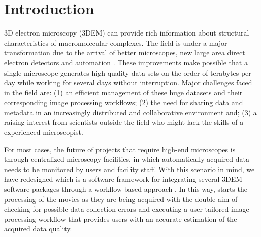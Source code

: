
\section{Introduction}

3D electron microscopy (3DEM)  can provide rich information about structural characteristics of macromolecular complexes. The field is under a major transformation due to the arrival of better microscopes, new large area direct electron detectors and automation \citep{kuhlbrandt2014a, Kuhlbrandt2014b}. These improvements make possible that a single microscope generates high quality data sets on the order of terabytes per day \citep{Saibil2015} while working for several days without interruption. Major challenges faced in the field are: (1) an efficient management of these huge datasets and their corresponding image processing workflows; (2) the need for sharing data and metadata  in an increasingly distributed and collaborative environment and; (3) a raising interest from scientists outside the field who might lack the skills of a experienced microscopist. %



For most cases, the future of projects that require high-end microscopes is through centralized microscopy facilities, in which automatically acquired data needs to be monitored by users and facility staff.  With this scenario in mind, we have redesigned \scipion which is a software framework for integrating several 3DEM software packages through a workflow-based approach \citep{delarosatrevin2016}. %
In this way, \scipion starts the processing of the movies as they are being acquired with the double aim of checking for possible data collection errors and executing a user-tailored image processing workflow that provides users with an accurate estimation of the acquired data quality.

